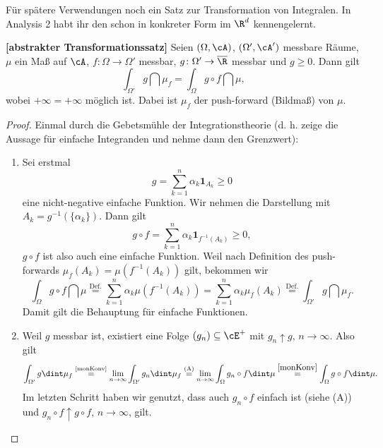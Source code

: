 F\"ur sp\"atere Verwendungen noch ein Satz zur Transformation von Integralen. In Analysis 2 habt ihr den schon in konkreter Form im $\R^d$ kennengelernt.
\begin{satz}\label{trafo}
 \textbf{[abstrakter Transformationssatz]}
	Seien $(\Omega, \cA)$, $(\Omega', \cA')$ messbare Räume, $\mu$ ein Maß auf $\cA$, $f \colon \Omega \rightarrow \Omega'$ messbar, $g \colon \Omega' \rightarrow \overline{\R}$ messbar und $g \geq 0$. Dann gilt 
	\[ \int_{\Omega'} g \dint \mu_f = \int_{\Omega} g \circ f \dint \mu, \] wobei $+\infty=+\infty$ m\"oglich ist. Dabei ist $\mu_f$ der push-forward (Bildma\ss ) von $\mu$.
\begin{center}	
\end{center}
\end{satz}
\begin{proof} Einmal durch die \glqq Gebetsm\"uhle\grqq{} der Integrationstheorie (d. h. zeige die Aussage f\"ur einfache Integranden und nehme dann den Grenzwert):
	\begin{enumerate}[label=(\Alph*)]
		\item Sei erstmal \[ g = \sum\limits_{k = 1}^{n} \alpha_k \mathbf{1}_{A_k} \geq 0 \] eine nicht-negative einfache Funktion. Wir nehmen die Darstellung mit $A_k=g^{-1}(\{\alpha_k\})$. Dann gilt \[ g \circ f = \sum\limits_{k = 1}^{n} \alpha_k \mathbf{1}_{f^{-1}(A_k)} \geq 0, \] $g\circ f$ ist also auch eine einfache Funktion. Weil nach Definition des push-forwards $ \mu_f(A_k) = \mu(f^{-1}(A_k)) $ gilt, bekommen wir \[ \int_{\Omega} g \circ f \dint \mu \overset{\text{Def.}}{=} \sum\limits_{k = 1}^{n} \alpha_k \mu(f^{-1}(A_k))=\sum\limits_{k = 1}^{n} \alpha_k \mu_f(A_k) \overset{\text{Def.}}{=} \int_{\Omega'} g \dint \mu_f. \]
		Damit gilt die Behauptung für einfache Funktionen.
		\item Weil $g$ messbar ist, existiert eine Folge $(g_n) \subseteq \cE^+$ mit $g_n \uparrow g$, $n \to \infty$. Also gilt \[ \int_{\Omega'} g \dint \mu_f \overset{\text{\ref{monKonv}}}{=} \lim\limits_{n \to \infty} \int_{\Omega'} g_n \dint \mu_f \overset{\text{(A)}}{=}  \lim_{n\to\infty} \int_{\Omega}g_n\circ f \dint \mu \overset{\ref{monKonv}}{=} \int_{\Omega} g \circ f \dint \mu. \]
		Im letzten Schritt haben wir genutzt, dass auch $g_n \circ f$ einfach ist (siehe (A)) und $g_n \circ f \uparrow g \circ f$, $n\to\infty$, gilt.
	\end{enumerate}
\end{proof}
